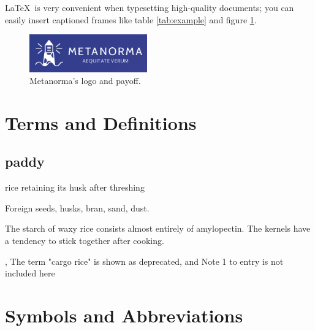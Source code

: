 \documentclass{Metanorma}
\begin{document}
  \begin{tip}
    \LaTeX is very convenient when typesetting high-quality documents;
    you can easily insert captioned frames
    like table \ref{tab:example} and figure \ref{fig:example}.
  \end{tip}

  \begin{figure}\label{fig:example}
    \centering
    \caption{Metanorma's logo and payoff.}
    \includegraphics[width=2in]{metanorma.png}
  \end{figure}


  \section{Terms and Definitions}

  \subsection{paddy}
  \label{paddy}

  rice retaining its husk after threshing

  \begin{example}
    Foreign seeds, husks, bran, sand, dust.
  \end{example}

  \begin{note}
    The starch of waxy rice consists almost entirely of amylopectin.
    The kernels have a tendency to stick together after cooking.
  \end{note}

  \begin{source}
    \cite{ISO7301}, The term "cargo rice" is shown as deprecated,
    and Note 1 to entry is not included here
  \end{source}


  \section{Symbols and Abbreviations}
\end{document}
